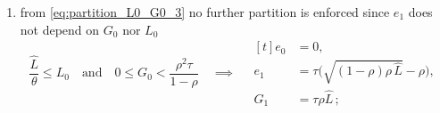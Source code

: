 \documentclass[a4paper,fleqn]{cas-sc}
\begin{document}
\begin{enumerate}
\begin{subequations}
\begin{align}
        &0 \leq L_0 < \frac{\rho}{(1-\rho)\tau}\quad\text{and}\quad\frac{\rho^4\tau}{(1-\rho)^3\,\theta^2}\,L_0^{-2}\leq G_0\;\implies\; 
        \begin{aligned}[t]
            e_0 &= -\rho\tau + \sqrt{\tau(1-\rho)G_0}, \\
            e_1 &= -\rho\tau+\sqrt{\tau(1-\rho)\sqrt{\tau(1-\rho)G_0}\,\theta L_0},\\
            G_1 &= \theta L_0\sqrt{\tau(1-\rho)G_0}\,,
        \end{aligned}
        \label{eq:sub_partition_2_2}\\
        &\frac{\rho}{(1-\rho)\tau}\leq L_0 < \frac{\hat{L}}{\theta}\quad\text{and}\quad\frac{\rho^2\tau}{1-\rho}\leq G_0\;\implies\; 
        \begin{aligned}[t]
            e_0 &= -\rho\tau + \sqrt{\tau(1-\rho)G_0}, \\
            e_1 &= -\rho\tau+\sqrt{\tau(1-\rho)\sqrt{\tau(1-\rho)G_0}\,\theta L_0},\\
            G_1 &= \theta L_0\sqrt{\tau(1-\rho)G_0}\,,
        \end{aligned}
        \label{eq:sub_partition_2_3}
    \end{align}
    \end{subequations}
    where we remark that \eqref{eq:sub_partition_2_2} and \eqref{eq:sub_partition_2_3} are indistinguishable for their values of $e_0$, $e_1$ and $G_1$ and therefore we can write it as
    \begin{equation}\label{eq:sub_partition_2_2_and_3}
        0 \leq L_0 < \frac{\hat{L}}{\theta}\quad\text{and}\quad\max\!\left(\frac{\rho^2\tau}{1-\rho},\,\frac{\rho^4\tau}{(1-\rho)^3\,\theta^2}\,L_0^{-2}\right)\leq G_0\;\implies\; \eqref{eq:sub_partition_2_2}\equiv\eqref{eq:sub_partition_2_3}
    \end{equation}
    \item from \eqref{eq:partition_L0_G0_3} no further partition is enforced since $e_1$ does not depend on $G_0$ nor $L_0$
    \begin{equation}\label{eq:sub_partition_3}
        \frac{\hat{L}}{\theta} \leq L_0\quad\text{and}\quad0\leq G_0 < \frac{\rho^2\tau}{1-\rho}\quad \implies\quad
        \begin{aligned}[t]
            e_0 &= 0, \\
            e_1 &= \tau\Big(\sqrt{(1-\rho)\rho\,\hat{L}}-\rho\Big),\\
            G_1 &= \tau\rho\hat{L}\,;

\end{aligned}
\end{equation}
\end{enumerate}
\end{document}
